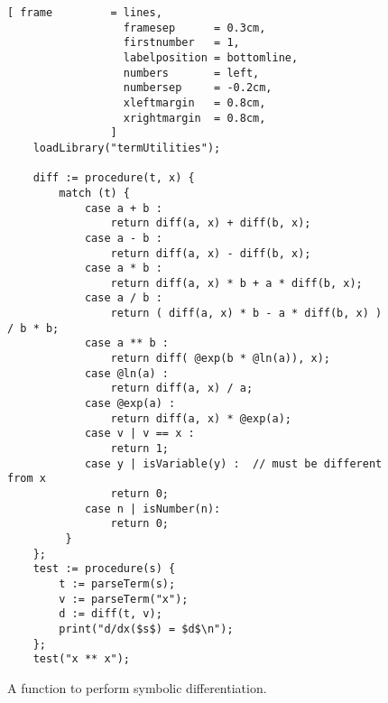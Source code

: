 \begin{figure}[!ht]
\centering
\begin{Verbatim}[ frame         = lines, 
                  framesep      = 0.3cm, 
                  firstnumber   = 1,
                  labelposition = bottomline,
                  numbers       = left,
                  numbersep     = -0.2cm,
                  xleftmargin   = 0.8cm,
                  xrightmargin  = 0.8cm,
                ]
    loadLibrary("termUtilities");  

    diff := procedure(t, x) {
        match (t) {
            case a + b :
                return diff(a, x) + diff(b, x);
            case a - b :
                return diff(a, x) - diff(b, x);
            case a * b :
                return diff(a, x) * b + a * diff(b, x);
            case a / b :
                return ( diff(a, x) * b - a * diff(b, x) ) / b * b;
            case a ** b :
                return diff( @exp(b * @ln(a)), x);
            case @ln(a) :
                return diff(a, x) / a;
            case @exp(a) :
                return diff(a, x) * @exp(a);
            case v | v == x :
                return 1;
            case y | isVariable(y) :  // must be different from x
                return 0;
            case n | isNumber(n):   
                return 0;  
         }
    };
    test := procedure(s) {
        t := parseTerm(s);
        v := parseTerm("x");
        d := diff(t, v);
        print("d/dx($s$) = $d$\n");
    };
    test("x ** x");
\end{Verbatim}
\vspace*{-0.3cm}
\caption{A function to perform symbolic differentiation.}
\label{fig:diff.stlx}
\end{figure}

